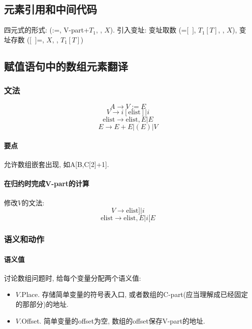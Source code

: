         \subsection{元素引用和中间代码}

            四元式的形式: (:=, V-part+$T_1$, \uline\quad, $X$). 引入\textsf{变址}: 变址取数 (=[\ ], $T_1[T]$, \uline\quad, $X$), 变址存数 ([\ ]=, $X$, \uline\quad, $T_1[T]$)

        \subsection{赋值语句中的数组元素翻译}

            \subsubsection{文法}

                \[A\to V:=E\]
                \[V\to i[\textrm{elist}]|i\]
                \[\textrm{elist}\to\textrm{elist},E|E\]
                \[E\to E+E|(E)|V\]

                \paragraph{要点}
                 允许数组嵌套出现, 如A[B,C[2]+1]. 

                \paragraph{在归约时完成V-part的计算}
                    修改$V$的文法:
                    \[V\to \textrm{elist}]|i\]
                    \[\textrm{elist}\to \textrm{elist}, E|i[E\]

            \subsubsection{语义和动作}

                \paragraph{语义值}
                    讨论数组问题时, 给每个变量分配两个语义值: 
                    \begin{itemize}
                        \item $V$.Place. 存储简单变量的符号表入口, 或者数组的C-part(应当理解成已经固定的那部分)的地址.
                        \item $V$.Offset. 简单变量的offset为空, 数组的offset保存V-part的地址.
                    \end{itemize}

